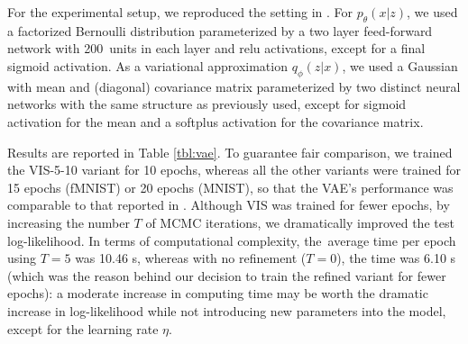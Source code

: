 For the experimental setup, we reproduced the setting in \cite{pmlr-v89-titsias19a}. For $p_{\theta}(x | z)$, we used a factorized Bernoulli distribution parameterized by a two layer feed-forward network with 200~units in each layer and relu activations, except for a final sigmoid activation. As a variational approximation $q_{\phi}(z | x)$, we used a Gaussian with mean and (diagonal) covariance matrix parameterized by
two distinct neural networks with the same structure as previously used, except for sigmoid activation for the mean and a softplus activation for the covariance matrix.




Results are reported in Table \ref{tbl:vae}. To guarantee 
 fair comparison, we trained the VIS-5-10 variant for 10 epochs, whereas all the other variants were trained for 15 epochs (fMNIST) or 20 epochs (MNIST), so that the VAE's performance was comparable to that reported in \cite{pmlr-v89-titsias19a}. Although VIS was trained for fewer epochs, by increasing the number $T$ of MCMC iterations, we dramatically improved the test log-likelihood. In terms of computational complexity, the~average time per epoch using $T=5$ was 10.46 s, whereas with no refinement ($T=0$), the time was 6.10 s (which was the reason behind our decision to train the refined variant for fewer epochs): a moderate increase in computing time may be worth the dramatic increase in log-likelihood while not introducing new parameters into the model, except for the learning rate $\eta$.
 
